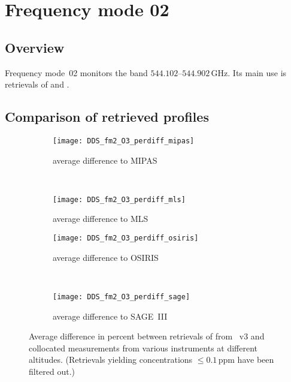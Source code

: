 \section{Frequency mode 02}
\label{sec:fm02}

\subsection{Overview}
\label{sec:fm02:overview}
Frequency mode~02 monitors the band $544.102$--$544.902\,\mathrm{GHz}$. Its
main use is retrievals of  and .


\subsection{Comparison of retrieved profiles}
\label{sec:fm02:comparison}



\begin{figure}[htpb]
    \centering
    \begin{subfigure}[b]{0.49\textwidth}
        \texttt{[image: DDS\_fm2\_O3\_perdiff\_mipas]}
        \caption{average difference to MIPAS}
        \label{fig:fm02:O3:profiles:MIPAS}
    \end{subfigure}
    \,
    \begin{subfigure}[b]{0.49\textwidth}
        \texttt{[image: DDS\_fm2\_O3\_perdiff\_mls]}
        \caption{average difference to MLS}
        \label{fig:fm02:O3:profiles:MLS}
    \end{subfigure}

    \begin{subfigure}[b]{0.49\textwidth}
        \texttt{[image: DDS\_fm2\_O3\_perdiff\_osiris]}
        \caption{average difference to OSIRIS}
        \label{fig:fm02:O3:profiles:OSIRIS}
    \end{subfigure}
    \,
    \begin{subfigure}[b]{0.49\textwidth}
        \texttt{[image: DDS\_fm2\_O3\_perdiff\_sage]}
        \caption{average difference to SAGE~III}
        \label{fig:fm02:O3:profiles:SAGEIII}
    \end{subfigure}
    \caption{Average difference in percent between retrievals of 
    from \smr~v3 and collocated measurements from various instruments at
    different altitudes. (Retrievals yielding concentrations
    $\leq 0.1\,\mathrm{ppm}$ have been filtered out.)}

    \label{fig:fm02:O3:profiles}
\end{figure}

